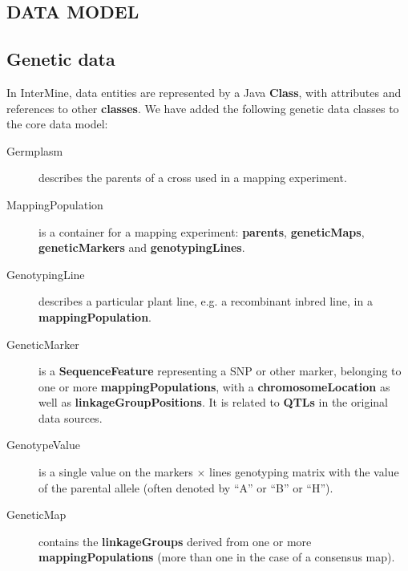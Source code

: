 \documentclass[]{pagposter}
\begin{document}
\begin{multicols*}{3}
  \color{Black}


  \section*{DATA MODEL}

  \subsection*{Genetic data}

  In InterMine, data entities are represented by a Java \textbf{Class}, with attributes and references to other \textbf{classes}.
  We have added the following genetic data classes to the core data model:

  \begin{description}

    \item[Germplasm] describes the parents of a cross used in a mapping experiment.

    \item[MappingPopulation] is a container for a mapping experiment: \textbf{parents}, \textbf{geneticMaps}, \textbf{geneticMarkers} and \textbf{genotypingLines}.
      
    \item[GenotypingLine] describes a particular plant line, e.g. a recombinant inbred line, in a \textbf{mappingPopulation}.
      
    \item[GeneticMarker] is a \textbf{SequenceFeature} representing a SNP or other marker, belonging to one or more \textbf{mappingPopulations},
      with a \textbf{chromosomeLocation} as well as \textbf{linkageGroupPositions}.
      It is related to \textbf{QTLs} in the original data sources.
      
    \item[GenotypeValue] is a single value on the markers $\times$ lines genotyping matrix with the value of the parental allele (often denoted by ``A'' or ``B'' or ``H'').
      
    \item[GeneticMap] contains the \textbf{linkageGroups} derived from one or more \textbf{mappingPopulations} (more than one in the case of a consensus map).
      

\end{description}
\end{multicols*}
\end{document}
